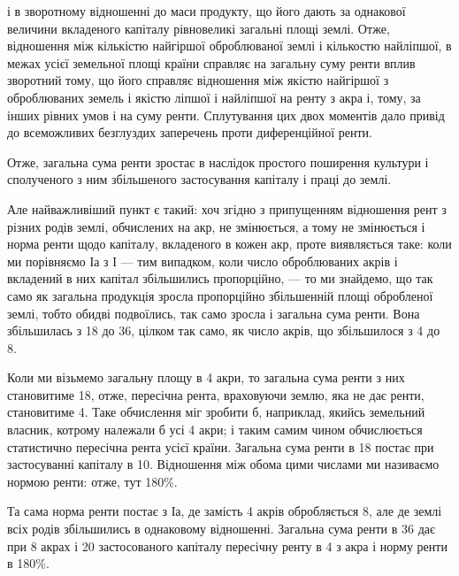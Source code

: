 \parcont{}  %
і в зворотному відношенні до маси продукту, що його дають за однакової величини
вкладеного капіталу рівновеликі загальні площі землі. Отже, відношення між
кількістю найгіршої оброблюваної землі і кількостю найліпшої, в межах усієї
земельної площі країни справляє на загальну суму ренти вплив зворотний
тому, що його справляє відношення між якістю найгіршої з оброблюваних земель
і якістю ліпшої і найліпшої на ренту з акра і, тому, за інших рівних
умов і на суму ренти. Сплутування цих двох моментів дало привід до всеможливих
безглуздих заперечень проти диференційної ренти.

Отже, загальна сума ренти зростає в наслідок простого поширення культури
і сполученого з ним збільшеного застосування капіталу і праці до землі.

Але найважливіший пункт є такий: хоч згідно з припущенням відношення
рент з різних родів землі, обчислених на акр, не змінюється, а тому
не змінюється і норма ренти щодо капіталу, вкладеного в кожен акр, проте
виявляється таке: коли ми порівняємо І$а$ з І — тим випадком, коли число оброблюваних
акрів і вкладений в них капітал збільшились пропорційно, — то ми знайдемо,
що так само як загальна продукція зросла пропорційно збільшенній площі
обробленої землі, тобто обидві подвоїлись, так само зросла і загальна сума ренти.
Вона збільшилась з 18 до 36, цілком так само, як число акрів, що
збільшилося з 4 до 8.

Коли ми візьмемо загальну площу в 4 акри, то загальна сума ренти з них
становитиме 18, отже, пересічна рента, враховуючи землю, яка не дає
ренти, становитиме 4. Таке обчислення міг зробити б, наприклад,
якийсь земельний власник, котрому належали б усі 4 акри; і таким самим
чином обчислюється статистично пересічна рента усієї країни. Загальна сума
ренти в 18 постає при застосуванні капіталу в 10.
Відношення між обома цими числами ми називаємо нормою ренти: отже, тут
180\%.

Та сама норма ренти постає з І$а$, де замість 4 акрів обробляється 8,
але де землі всіх родів збільшились в однаковому відношенні. Загальна сума
ренти в 36 дає при 8 акрах і 20 застосованого капіталу
пересічну ренту в 4 з акра і норму ренти в 180\%.

